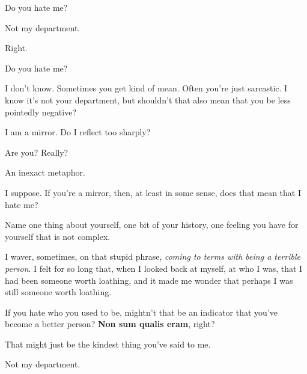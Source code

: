 Do you hate me?

\begin{ally}
Not my department.
\end{ally}
Right.

\begin{ally}
Do you hate me?
\end{ally}
I don't know. Sometimes you get kind of mean. Often you're just sarcastic. I know it's not your department, but shouldn't that also mean that you be less pointedly negative?

\begin{ally}
I am a mirror. Do I reflect too sharply?
\end{ally}
Are you? Really?

\begin{ally}
An inexact metaphor.
\end{ally}
I suppose. If you're a mirror, then, at least in some sense, does that mean that I hate me?

\begin{ally}
Name one thing about yourself, one bit of your history, one feeling you have for yourself that is not complex.
\end{ally}
I waver, sometimes, on that stupid phrase, \emph{coming to terms with being a terrible person}. I felt for so long that, when I looked back at myself, at who I was, that I had been someone worth loathing, and it made me wonder that perhaps I was still someone worth loathing.

\begin{ally}
If you hate who you used to be, mightn't that be an indicator that you've become a better person? \textbf{Non sum qualis eram}, right?
\end{ally}
That might just be the kindest thing you've said to me.

\begin{ally}
Not my department.
\end{ally}
\newpage
